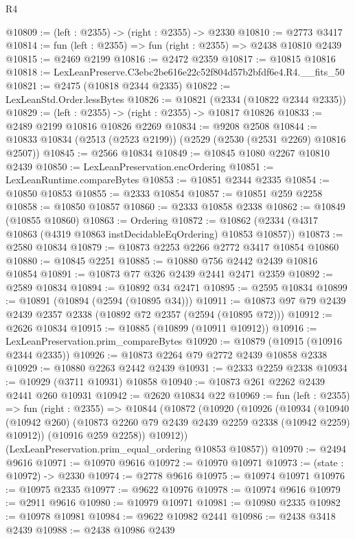\begin{lexlean}{R4}
\begin{coremodule}
@10809 := (left : @2355) -> (right : @2355) -> @2330
@10810 := @2773 @3417
@10814 := fun (left : @2355) => fun (right : @2355) => @2438 @10810 @2439
@10815 := @2469 @2199
@10816 := @2472 @2359
@10817 := @10815 @10816
@10818 := LexLeanPreserve.C3ebc2be616e22c52f804d57b2bfdf6e4.R4.__fits_50
@10821 := @2475 (@10818 @2344 @2335)
@10822 := LexLeanStd.Order.lessBytes
@10826 := @10821 (@2334 (@10822 @2344 @2335))
@10829 := (left : @2355) -> (right : @2355) -> @10817 @10826
@10833 := @2489 @2199 @10816 @10826 @2269
@10834 := @9208 @2508
@10844 := @10833 @10834 (@2513 (@2523 @2199)) (@2529 (@2530 (@2531 @2269) @10816 @2507))
@10845 := @2566 @10834
@10849 := @10845 @1080 @2267 @10810 @2439
@10850 := LexLeanPreservation.encOrdering
@10851 := LexLeanRuntime.compareBytes
@10853 := @10851 @2344 @2335
@10854 := @10850 @10853
@10855 := @2333 @10854
@10857 := @10851 @259 @2258
@10858 := @10850 @10857
@10860 := @2333 @10858 @2338
@10862 := @10849 (@10855 @10860)
@10863 := Ordering
@10872 := @10862 (@2334 (@4317 @10863 (@4319 @10863 instDecidableEqOrdering) @10853 @10857))
@10873 := @2580 @10834
@10879 := @10873 @2253 @2266 @2772 @3417 @10854 @10860
@10880 := @10845 @2251
@10885 := @10880 @756 @2442 @2439 @10816 @10854
@10891 := @10873 @77 @326 @2439 @2441 @2471 @2359
@10892 := @2589 @10834
@10894 := @10892 @34 @2471
@10895 := @2595 @10834
@10899 := @10891 (@10894 (@2594 (@10895 @34)))
@10911 := @10873 @97 @79 @2439 @2439 @2357 @2338 (@10892 @72 @2357 (@2594 (@10895 @72)))
@10912 := @2626 @10834
@10915 := @10885 (@10899 (@10911 @10912))
@10916 := LexLeanPreservation.prim_compareBytes
@10920 := @10879 (@10915 (@10916 @2344 @2335))
@10926 := @10873 @2264 @79 @2772 @2439 @10858 @2338
@10929 := @10880 @2263 @2442 @2439
@10931 := @2333 @2259 @2338
@10934 := @10929 (@3711 @10931) @10858
@10940 := @10873 @261 @2262 @2439 @2441 @260 @10931
@10942 := @2620 @10834 @22
@10969 := fun (left : @2355) =>
  fun (right : @2355) =>
  @10844
    (@10872
      (@10920
        (@10926
          (@10934
            (@10940 (@10942 @260) (@10873 @2260 @79 @2439 @2439 @2259 @2338 (@10942 @2259) @10912))
            (@10916 @259 @2258))
          @10912))
      (LexLeanPreservation.prim_equal_ordering @10853 @10857))
@10970 := @2494 @9616
@10971 := @10970 @9616
@10972 := @10970 @10971
@10973 := (state : @10972) -> @2330
@10974 := @2778 @9616
@10975 := @10974 @10971
@10976 := @10975 @2335
@10977 := @9622 @10976
@10978 := @10974 @9616
@10979 := @2911 @9616
@10980 := @10979 @10971
@10981 := @10980 @2335
@10982 := @10978 @10981
@10984 := @9622 @10982 @2441
@10986 := @2438 @3418 @2439
@10988 := @2438 @10986 @2439

\end{coremodule}
\end{lexlean}
